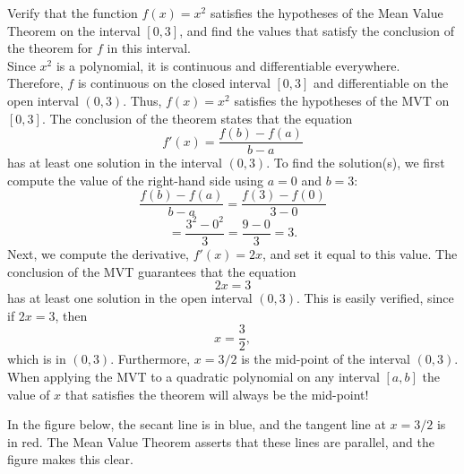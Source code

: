 \documentclass[handout]{ximera}
\begin{document}
\begin{example}[example 3]
Verify that the function $f(x) = x^2$ satisfies the hypotheses of the Mean Value Theorem
on the interval $[0,3]$, and find the values that satisfy the conclusion of the theorem for $f$ in this interval.\\
Since $x^2$ is a polynomial, it is continuous and differentiable everywhere. Therefore, $f$ is continuous on the 
closed interval $[0, 3]$ and differentiable on the open interval $(0, 3)$. 
Thus, $f(x) = x^2$ satisfies the hypotheses of the MVT on $[0, 3]$. The conclusion of the theorem states that the equation
\[
f'(x) = \frac{f(b) - f(a)}{b-a}
\]
has at least one solution in the interval $(0, 3)$. To find the solution(s), 
we first compute the value of the right-hand side using $a = 0$ and $b = 3$:
\[\frac{f(b) - f(a)}{b-a} = \frac{f(3) - f(0)}{3-0} \]
\[= \frac{3^2 - 0^2}{3}= \frac{9 - 0}{3} = 3.\]
Next, we compute the derivative, $f'(x) = 2x$, and set it equal to this value.
The conclusion of the MVT guarantees that the equation
\[2x = 3\]
has at least one solution in the open interval $(0,3)$.
This is easily verified, since if $2x = 3$, then 
\[x = \frac{3}{2},
\]
which is in $(0, 3)$.
Furthermore, $x = 3/2$ is the mid-point of the interval $(0, 3)$.
When applying the MVT to a quadratic polynomial on any interval $[a, b]$ the value of $x$ that satisfies the 
theorem will always be the mid-point!

In the figure below, the secant line is in blue, 
and the tangent line at $x = 3/2$ is in red. The Mean Value Theorem asserts that these lines are parallel, 
and the figure makes this clear.

\begin{image}
\end{image}


\end{example}
\end{document}
